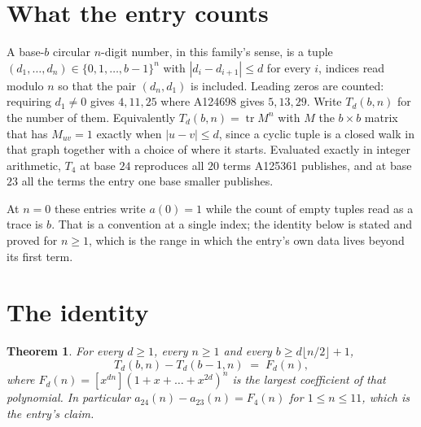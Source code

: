 \documentclass[11pt,a4paper]{article}
\theoremstyle{plain}
\newtheorem{theorem}{Theorem}
\theoremstyle{definition}
\begin{document}
\section{What the entry counts}

A base-$b$ circular $n$-digit number, in this family's sense, is a tuple
$(d_1,\dots,d_n)\in\{0,1,\dots,b-1\}^{n}$ with $|d_i-d_{i+1}|\le d$ for every $i$, indices
read modulo $n$ so that the pair $(d_n,d_1)$ is included. Leading zeros are counted: requiring
$d_1\ne0$ gives $4,11,25$ where A124698 gives $5,13,29$. Write $T_d(b,n)$ for the number of
them. Equivalently $T_d(b,n)=\operatorname{tr}M^{n}$ with $M$ the $b\times b$ matrix that has
$M_{uv}=1$ exactly when $|u-v|\le d$, since a cyclic tuple is a closed walk in that graph
together with a choice of where it starts. Evaluated exactly in integer arithmetic, $T_{4}$
at base $24$ reproduces all $20$ terms A125361 publishes, and at base $23$ all the
terms the entry one base smaller publishes.

At $n=0$ these entries write $a(0)=1$ while the count of empty tuples read as a trace is $b$.
That is a convention at a single index; the identity below is stated and proved for $n\ge1$,
which is the range in which the entry's own data lives beyond its first term.

\section{The identity}

\begin{theorem}
For every $d\ge1$, every $n\ge1$ and every $b\ge d\lfloor n/2\rfloor+1$,
\[
T_d(b,n)-T_d(b-1,n)\;=\;F_d(n),
\]
where $F_d(n)=[x^{dn}](1+x+\dots+x^{2d})^{n}$ is the largest coefficient of that
polynomial. In particular $a_{24}(n)-a_{23}(n)=F_{4}(n)$ for $1\le n\le11$, which
is the entry's claim.
\end{theorem}
\end{document}
